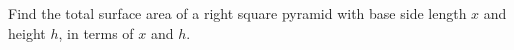 Find the total surface area of a right square pyramid with base side length $x$ and height $h$, in terms of $x$ and $h$.
